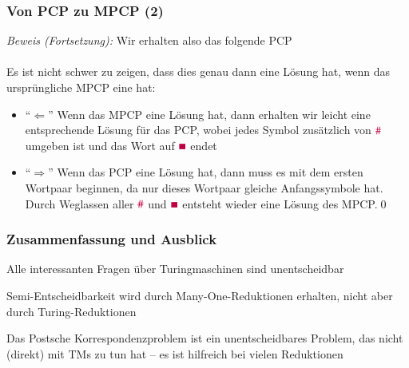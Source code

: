 \documentclass[aspectratio=1610,onlymath]{beamer}
\begin{document}
\begin{frame}[t]\frametitle{Von PCP zu MPCP (2)}

% 

\emph{Beweis (Fortsetzung):} Wir erhalten also das folgende PCP\\[1ex]
\\[1ex]
%
Es ist nicht schwer zu zeigen, dass dies genau dann eine Lösung hat, wenn das ursprüngliche MPCP eine hat:\pause
\begin{itemize}
\item "`$\Leftarrow$"' Wenn das MPCP eine Lösung hat, dann erhalten wir leicht eine entsprechende Lösung für das PCP, wobei jedes Symbol zusätzlich von $\mathtt{\textcolor{purple}{\#}}$ umgeben ist und das Wort auf $\mathtt{\textcolor{purple}{\blacksquare}}$ endet\pause
\item "`$\Rightarrow$"' Wenn das PCP eine Lösung hat, dann muss es mit dem ersten Wortpaar beginnen, da nur dieses Wortpaar gleiche Anfangssymbole hat. Durch Weglassen aller $\mathtt{\textcolor{purple}{\#}}$ und 
$\mathtt{\textcolor{purple}{\blacksquare}}$ entsteht wieder eine Lösung des MPCP.\qed
\end{itemize}

\end{frame}


\begin{frame}\frametitle{Zusammenfassung und Ausblick}

Alle interessanten Fragen über Turingmaschinen sind unentscheidbar\bigskip

\alert{Semi-Entscheidbarkeit} wird durch Many-One-Reduktionen erhalten, nicht aber durch Turing-Reduktionen\bigskip

Das \alert{Postsche Korrespondenzproblem} ist ein unentscheidbares Problem, das nicht (direkt) mit TMs zu tun hat -- es ist hilfreich bei vielen Reduktionen\bigskip


\end{frame}
\end{document}
